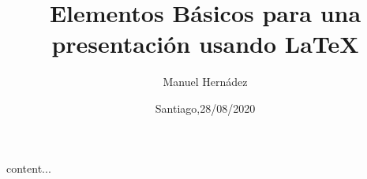 \documentclass{beamer}
\begin{document}
	
\author[Manuel]{Manuel Hernádez}
\title{Elementos Básicos para una presentación usando \LaTeX{}}
\date{Santiago,28/08/2020}
\frame{\titlepage}


	
	content...
\end{document}
